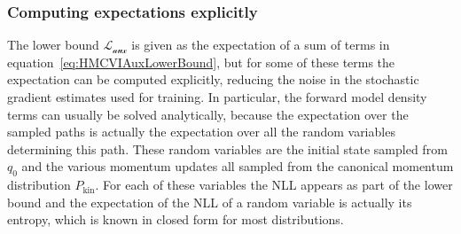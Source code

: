 \subsubsection{Computing expectations explicitly}

The lower bound $\mathcal{L_\textrm{aux}}$ is given as the expectation of a sum of terms in equation~\eqref{eq:HMCVIAuxLowerBound}, but for some of these terms the expectation can be computed explicitly, reducing the noise in the stochastic gradient estimates used for training. In particular, the forward model density terms can usually be solved analytically, because the expectation over the sampled paths is actually the expectation over all the random variables determining this path. These random variables are the initial state sampled from $q_0$ and the various momentum updates all sampled from the canonical momentum distribution $P_\textrm{kin}$. For each of these variables the NLL appears as part of the lower bound and the expectation of the NLL of a random variable is actually its entropy, which is known in closed form for most distributions.